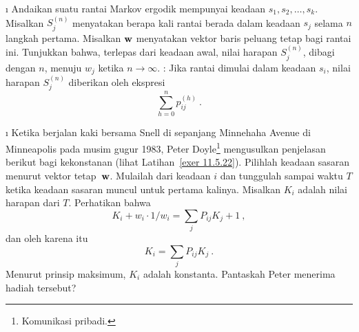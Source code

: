 \begin{LJSItem}
\i\label{exer 11.5.29} Andaikan suatu rantai Markov ergodik mempunyai keadaan
$s_1, s_2, \ldots, s_k$. Misalkan $S^{(n)}_j$ menyatakan berapa kali rantai
berada dalam keadaan $s_j$ selama $n$ langkah pertama. Misalkan ${\mbox{\bf w}\/}$
menyatakan vektor baris peluang tetap bagi rantai ini. Tunjukkan bahwa, terlepas
dari keadaan awal, nilai harapan $S^{(n)}_j$, dibagi dengan $n$, menuju $w_j$
ketika $n \rightarrow \infty$. : Jika rantai dimulai dalam
keadaan $s_i$, nilai harapan $S^{(n)}_j$ diberikan oleh ekspresi
$$\sum_{h = 0}^n p^{(h)}_{ij}\ .$$

\i\label{exer 11.5.27} Ketika berjalan kaki bersama Snell di sepanjang Minnehaha Avenue di Minneapolis
pada musim gugur 1983, Peter Doyle\footnote{Komunikasi
pribadi.} mengusulkan penjelasan berikut bagi kekonstanan
 (lihat
Latihan~\ref{exer 11.5.22}). Pilihlah keadaan sasaran menurut
vektor tetap~${\mbox{\bf w}\/}$. Mulailah dari keadaan $i$ dan tunggulah sampai waktu $T$ ketika
keadaan sasaran muncul untuk pertama kalinya. Misalkan $K_i$ adalah nilai harapan
dari $T$. Perhatikan bahwa
$$
K_i + w_i \cdot 1/w_i= \sum_j P_{ij} K_j + 1\ ,
$$
dan oleh karena itu
$$
K_i = \sum_j P_{ij} K_j\ .
$$
Menurut prinsip maksimum, $K_i$ adalah konstanta.
Pantaskah Peter menerima hadiah tersebut?
\end{LJSItem}
